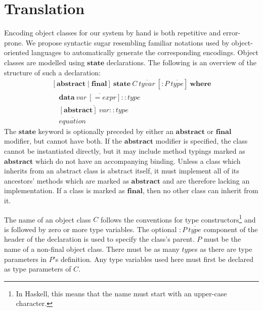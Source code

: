 \documentclass[authoryear,preprint]{sigplanconf}
\begin{document}
\section{Translation}
\label{sec:auto}

Encoding object classes for our system by hand is both repetitive and error-prone. We propose syntactic sugar resembling familiar notations used by object-oriented languages to automatically generate the corresponding encodings. Object classes are modelled using $\mathbf{state}$ declarations. The following is an overview of the structure of such a declaration:
\begin{displaymath}
\begin{array}{l}
[\mathbf{abstract} \mid \mathbf{final}]~\mathbf{state}~\mathit{C}~\overline{\mathit{tyvar}}~[: P~\overline{\mathit{type}}]~\mathbf{where} \\
\quad \overline{\mathbf{data}~\mathit{var}~[= \mathit{expr}] :: \mathit{type}} \\
\quad \overline{[\mathbf{abstract}]~\mathit{var} :: \mathit{type}} \\
\quad \overline{\mathit{equation}}
\end{array}
\end{displaymath}
The $\mathbf{state}$ keyword is optionally preceded by either an $\mathbf{abstract}$ or $\mathbf{final}$ modifier, but cannot have both. If the $\mathbf{abstract}$ modifier is specified, the class cannot be instantiated directly, but it may include method typings marked as $\mathbf{abstract}$ which do not have an accompanying binding. Unless a class which inherits from an abstract class is abstract itself, it must implement all of its ancestors' methods which are marked as $\mathbf{abstract}$ and are therefore lacking an implementation. If a class is marked as $\mathbf{final}$, then no other class can inherit from it.

The name of an object class $C$ follows the conventions for type constructors\footnote{In Haskell, this means that the name must start with an upper-case character.} and is followed by zero or more type variables. The optional $: \mathit{P}~\overline{\mathit{type}}$ component of the header of the declaration is used to specify the class's parent. $P$ must be the name of a non-final object class. There must be as many $\mathit{type}$s as there are type parameters in $P$'s definition. Any type variables used here must first be declared as type parameters of $C$.
\end{document}
